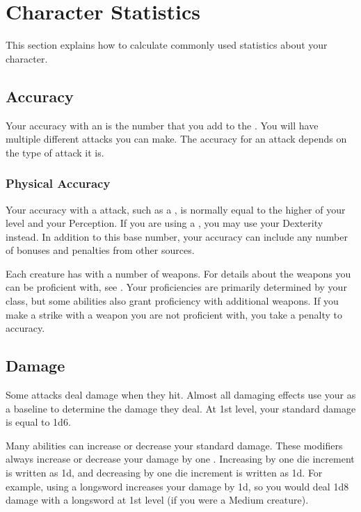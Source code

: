 \section{Character Statistics}
    This section explains how to calculate commonly used statistics about your character.

    \subsection{Accuracy}\label{Accuracy}
        Your accuracy with an  is the number that you add to the .
        You will have multiple different attacks you can make.
        The accuracy for an attack depends on the type of attack it is.

        \subsubsection{Physical Accuracy}\label{Physical Accuracy}
            Your accuracy with a  attack, such as a , is normally equal to the higher of your level and your Perception.
            If you are using a , you may use your Dexterity instead.
            In addition to this base number, your accuracy can include any number of bonuses and penalties from other sources.

             Each creature has  with a number of weapons.
            For details about the weapons you can be proficient with, see .
            Your proficiencies are primarily determined by your class, but some abilities also grant proficiency with additional weapons.
            If you make a strike with a weapon you are not proficient with, you take a  penalty to accuracy.

    \subsection{Damage}\label{Damage}
        Some attacks deal damage when they hit.
        Almost all damaging effects use your  as a baseline to determine the damage they deal.
        At 1st level, your standard damage is equal to 1d6.

        Many abilities can increase or decrease your standard damage.
        These modifiers always increase or decrease your damage by one .
        Increasing by one die increment is written as \plus1d, and decreasing by one die increment is written as \minus1d.
        For example, using a longsword increases your damage by \plus1d, so you would deal 1d8 damage with a longsword at 1st level (if you were a Medium creature).
        
